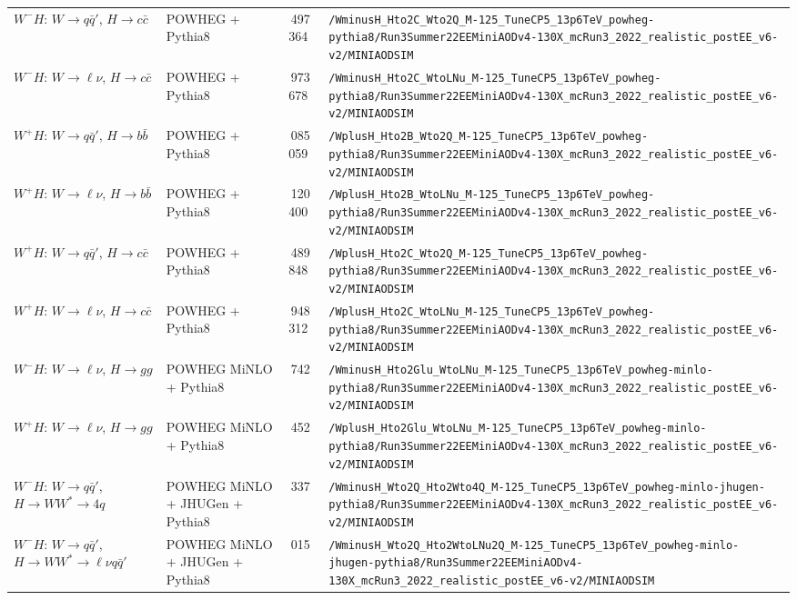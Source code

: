 \begin{landscape}
\begin{longtable}{@{}>{\raggedright\arraybackslash}p{3.2cm}>{\raggedright\arraybackslash}p{3.6cm}>{\raggedleft\arraybackslash}p{1.6cm}>{\raggedright\arraybackslash}p{13.5cm}@{}}
$W^-H$: $W\to q\bar q'$, $H\to c\bar c$ & POWHEG + Pythia8 & 15\,497\,364 & \nolinkurl{/WminusH_Hto2C_Wto2Q_M-125_TuneCP5_13p6TeV_powheg-pythia8/Run3Summer22EEMiniAODv4-130X_mcRun3_2022_realistic_postEE_v6-v2/MINIAODSIM} \\
$W^-H$: $W\to \ell\nu$, $H\to c\bar c$ & POWHEG + Pythia8 & 2\,973\,678 & \nolinkurl{/WminusH_Hto2C_WtoLNu_M-125_TuneCP5_13p6TeV_powheg-pythia8/Run3Summer22EEMiniAODv4-130X_mcRun3_2022_realistic_postEE_v6-v2/MINIAODSIM} \\
$W^+H$: $W\to q\bar q'$, $H\to b\bar b$ & POWHEG + Pythia8 & 4\,085\,059 & \nolinkurl{/WplusH_Hto2B_Wto2Q_M-125_TuneCP5_13p6TeV_powheg-pythia8/Run3Summer22EEMiniAODv4-130X_mcRun3_2022_realistic_postEE_v6-v2/MINIAODSIM} \\
$W^+H$: $W\to \ell\nu$, $H\to b\bar b$ & POWHEG + Pythia8 & 2\,120\,400 & \nolinkurl{/WplusH_Hto2B_WtoLNu_M-125_TuneCP5_13p6TeV_powheg-pythia8/Run3Summer22EEMiniAODv4-130X_mcRun3_2022_realistic_postEE_v6-v2/MINIAODSIM} \\
$W^+H$: $W\to q\bar q'$, $H\to c\bar c$ & POWHEG + Pythia8 & 15\,489\,848 & \nolinkurl{/WplusH_Hto2C_Wto2Q_M-125_TuneCP5_13p6TeV_powheg-pythia8/Run3Summer22EEMiniAODv4-130X_mcRun3_2022_realistic_postEE_v6-v2/MINIAODSIM} \\
$W^+H$: $W\to \ell\nu$, $H\to c\bar c$ & POWHEG + Pythia8 & 2\,948\,312 & \nolinkurl{/WplusH_Hto2C_WtoLNu_M-125_TuneCP5_13p6TeV_powheg-pythia8/Run3Summer22EEMiniAODv4-130X_mcRun3_2022_realistic_postEE_v6-v2/MINIAODSIM} \\
$W^-H$: $W\to \ell\nu$, $H\to gg$ & POWHEG MiNLO + Pythia8 & 399\,742 & \nolinkurl{/WminusH_Hto2Glu_WtoLNu_M-125_TuneCP5_13p6TeV_powheg-minlo-pythia8/Run3Summer22EEMiniAODv4-130X_mcRun3_2022_realistic_postEE_v6-v2/MINIAODSIM} \\
$W^+H$: $W\to \ell\nu$, $H\to gg$ & POWHEG MiNLO + Pythia8 & 592\,452 & \nolinkurl{/WplusH_Hto2Glu_WtoLNu_M-125_TuneCP5_13p6TeV_powheg-minlo-pythia8/Run3Summer22EEMiniAODv4-130X_mcRun3_2022_realistic_postEE_v6-v2/MINIAODSIM} \\
$W^-H$: $W\to q\bar q'$, $H\to WW^*\to 4q$ & POWHEG MiNLO + JHUGen + Pythia8 & 690\,337 & \nolinkurl{/WminusH_Wto2Q_Hto2Wto4Q_M-125_TuneCP5_13p6TeV_powheg-minlo-jhugen-pythia8/Run3Summer22EEMiniAODv4-130X_mcRun3_2022_realistic_postEE_v6-v2/MINIAODSIM} \\
$W^-H$: $W\to q\bar q'$, $H\to WW^*\to\ell\nu q\bar q'$ & POWHEG MiNLO + JHUGen + Pythia8 & 749\,015 & \nolinkurl{/WminusH_Wto2Q_Hto2WtoLNu2Q_M-125_TuneCP5_13p6TeV_powheg-minlo-jhugen-pythia8/Run3Summer22EEMiniAODv4-130X_mcRun3_2022_realistic_postEE_v6-v2/MINIAODSIM} \\

\end{longtable}
\end{landscape}
